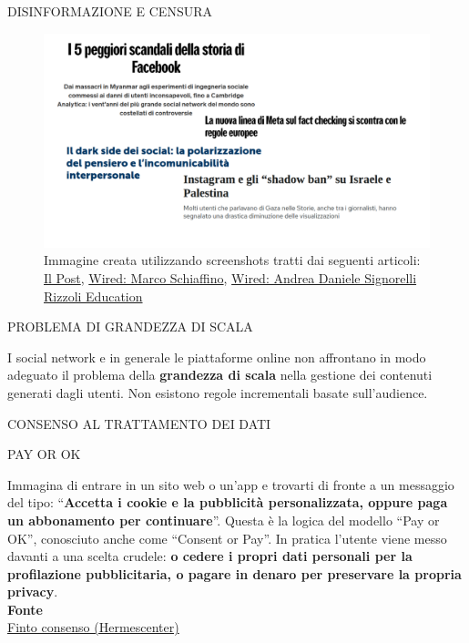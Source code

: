 \documentclass[aspectratio=1610]{beamer}
\begin{document}
\begin{frame}{DISINFORMAZIONE E CENSURA}
    \begin{figure}
        \includegraphics[width=.65\linewidth]{img/disinformazione.png}
        \caption{
            Immagine creata utilizzando screenshots tratti dai seguenti articoli:
            \href{https://www.ilpost.it/2023/10/19/shadow-ban-palestina-instagram/}{Il Post},
            \href{https://www.wired.it/article/meta-fact-checking-regole-europee-scorza/}{Wired: Marco Schiaffino},
            \href{https://www.wired.it/article/facebook-peggiori-scandali-cambridge-analytica-pubblicita-trump/}{Wired: Andrea Daniele Signorelli}
            \href{https://www.rizzolieducation.it/news/il-dark-side-dei-social-la-polarizzazione-del-pensiero-e-lincomunicabilita-interpersonale/}{Rizzoli Education}
        }
    \end{figure}
    \pause
    \begin{alertblock}{PROBLEMA DI GRANDEZZA DI SCALA}
        \begin{minipage}{0.96\linewidth}
            \justifying
            I social network e in generale le piattaforme online non affrontano in modo 
            adeguato il problema della \textbf{grandezza di scala} nella gestione dei contenuti 
            generati dagli utenti. Non esistono regole incrementali basate sull’audience.
        \end{minipage}
    \end{alertblock}
\end{frame}

\begin{frame}{CONSENSO AL TRATTAMENTO DEI DATI}
    \begin{alertblock}{PAY OR OK}
        \begin{minipage}{0.98\linewidth}
            \justifying
            Immagina di entrare in un sito web o un’app e trovarti di fronte a un 
            messaggio del tipo: ``\textbf{Accetta i cookie e la pubblicità personalizzata, 
            oppure paga un abbonamento per continuare}''. Questa è la logica del 
            modello ``Pay or OK'', conosciuto anche come ``Consent or Pay''. In pratica 
            l’utente viene messo davanti a una scelta crudele: \textbf{o cedere i propri dati 
            personali per la profilazione pubblicitaria, o pagare in denaro per preservare 
            la propria privacy}.\\
            \bigskip
            \tiny{\textbf{Fonte}}\\
            \tiny{\href{https://finto-consenso.hermescenter.org/problema/}{Finto consenso (Hermescenter)}}
        \end{minipage}
    \end{alertblock}
\end{frame}
\end{document}
